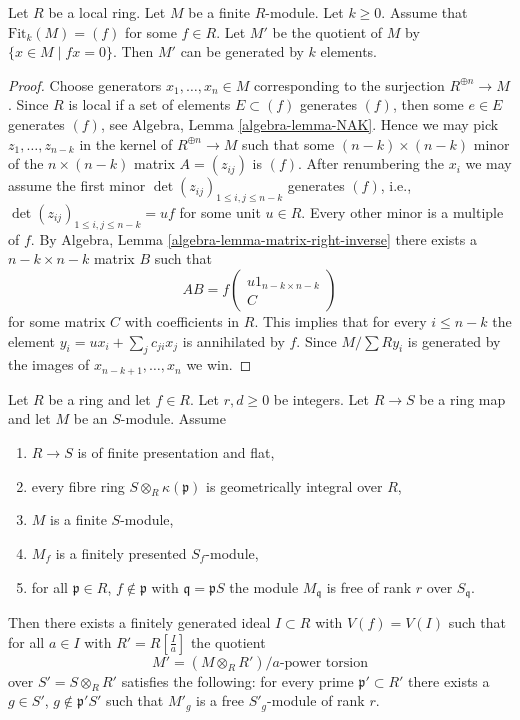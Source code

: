 \begin{lemma}
\label{lemma-principal-fitting-ideal}
Let $R$ be a local ring. Let $M$ be a finite $R$-module. Let $k \geq 0$.
Assume that $\text{Fit}_k(M) = (f)$ for some $f \in R$.
Let $M'$ be the quotient of $M$ by $\{x \in M \mid fx = 0\}$. Then
$M'$ can be generated by $k$ elements.
\end{lemma}

\begin{proof}
Choose generators $x_1, \ldots, x_n \in M$ corresponding to the
surjection $R^{\oplus n} \to M$. Since $R$ is local if a set
of elements $E \subset (f)$ generates $(f)$, then some $e \in E$ generates
$(f)$, see Algebra, Lemma \ref{algebra-lemma-NAK}. Hence we may pick
$z_1, \ldots, z_{n - k}$ in the kernel of $R^{\oplus n} \to M$ such
that some $(n - k) \times (n - k)$ minor of the $n \times (n - k)$
matrix $A = (z_{ij})$ is $(f)$. After renumbering the $x_i$ we may
assume the first minor $\det(z_{ij})_{1 \leq i, j \leq n - k}$
generates $(f)$, i.e., $\det(z_{ij})_{1 \leq i, j \leq n - k} = uf$
for some unit $u \in R$. Every other minor is a multiple of $f$.
By Algebra, Lemma \ref{algebra-lemma-matrix-right-inverse} there exists a
$n - k \times n - k$ matrix $B$ such that
$$
AB = f
\left(
\begin{matrix}
u 1_{n - k \times n - k} \\
C
\end{matrix}
\right)
$$
for some matrix $C$ with coefficients in $R$. This implies that for every
$i \leq n - k$ the element $y_i = ux_i + \sum_j c_{ji}x_j$ is annihilated
by $f$. Since $M/\sum Ry_i$ is generated by the images of
$x_{n - k + 1}, \ldots, x_n$ we win.
\end{proof}

\begin{lemma}
\label{lemma-helper-blowup-affine-space}
Let $R$ be a ring and let $f \in R$. Let $r, d \geq 0$ be integers.
Let $R \to S$ be a ring map and let $M$ be an $S$-module. Assume
\begin{enumerate}
\item $R \to S$ is of finite presentation and flat,
\item every fibre ring $S \otimes_R \kappa(\mathfrak p)$ is
geometrically integral over $R$,
\item $M$ is a finite $S$-module,
\item $M_f$ is a finitely presented $S_f$-module,
\item for all $\mathfrak p \in R$, $f \not \in \mathfrak p$ with
$\mathfrak q = \mathfrak pS$ the module $M_{\mathfrak q}$ is free
of rank $r$ over $S_\mathfrak q$.
\end{enumerate}
Then there exists a finitely generated ideal $I \subset R$ with
$V(f) = V(I)$ such that for all $a \in I$ with $R' = R[\frac{I}{a}]$
the quotient
$$
M' = (M \otimes_R R')/a\text{-power torsion}
$$
over $S' = S \otimes_R R'$ satisfies the following: for every prime
$\mathfrak p' \subset R'$ there exists a $g \in S'$,
$g \not \in \mathfrak p'S'$ such that $M'_g$ is a free $S'_g$-module
of rank $r$.
\end{lemma}

